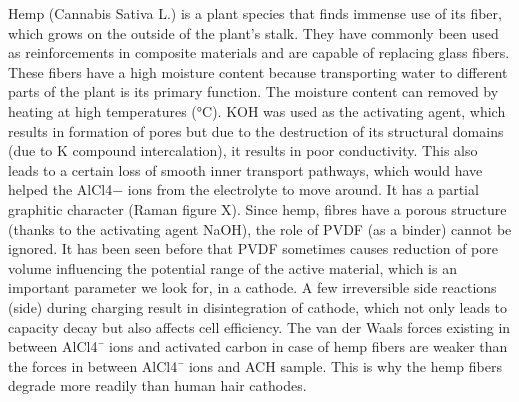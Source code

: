 \documentclass{article}
\begin{document}
Hemp (Cannabis Sativa L.) is a plant species that finds immense use of its fiber, which grows on the outside of the plant’s stalk. They have commonly been used as reinforcements in composite materials and are capable of replacing glass fibers. These fibers have a high moisture content because transporting water to different parts of the plant is its primary function. The moisture content can removed by heating at high temperatures (°C). KOH was used as the activating agent, which results in formation of pores but due to the destruction of its structural domains (due to K compound intercalation), it results in poor conductivity. This also leads to a certain loss of smooth inner transport pathways, which would have helped the AlCl4− ions from the electrolyte to move around. It has a partial graphitic character (Raman figure X). Since hemp, fibres have a porous structure (thanks to the activating agent NaOH), the role of PVDF (as a binder) cannot be ignored. It has been seen before that PVDF sometimes causes reduction of pore volume influencing the potential range of the active material, which is an important parameter we look for, in a cathode. A few irreversible side reactions (side) during charging result in disintegration of cathode, which not only leads to capacity decay but also affects cell efficiency. The van der Waals forces existing in between AlCl4¯ ions and activated carbon in case of hemp fibers are weaker than the forces in between AlCl4¯ ions and ACH sample. This is why the hemp fibers degrade more readily than human hair cathodes. 
\end{document}
